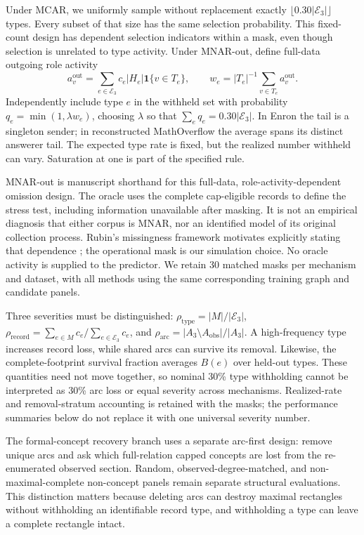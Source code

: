 \documentclass[10pt]{article}
\newcommand{\ind}{\mathbf{1}}
\begin{document}
Under MCAR, we uniformly sample without replacement exactly $\lfloor0.30|\mathcal E_3|\rfloor$ types. Every subset of that size has the same selection probability. This fixed-count design has dependent selection indicators within a mask, even though selection is unrelated to type activity. Under MNAR-out, define full-data outgoing role activity
\begin{equation}
a_v^{\mathrm{out}}=\sum_{e\in\mathcal E_3}c_e|H_e|\ind\{v\in T_e\},\qquad
w_e=|T_e|^{-1}\sum_{v\in T_e}a_v^{\mathrm{out}}.
\label{eq:activity}
\end{equation}
Independently include type $e$ in the withheld set with probability $q_e=\min(1,\lambda w_e)$, choosing $\lambda$ so that $\sum_e q_e=0.30|\mathcal E_3|$. In Enron the tail is a singleton sender; in reconstructed MathOverflow the average spans its distinct answerer tail. The expected type rate is fixed, but the realized number withheld can vary. Saturation at one is part of the specified rule.

MNAR-out is manuscript shorthand for this full-data, role-activity-dependent omission design. The oracle uses the complete cap-eligible records to define the stress test, including information unavailable after masking. It is not an empirical diagnosis that either corpus is MNAR, nor an identified model of its original collection process. Rubin's missingness framework motivates explicitly stating that dependence \citep{rubin1976}; the operational mask is our simulation choice. No oracle activity is supplied to the predictor. We retain 30 matched masks per mechanism and dataset, with all methods using the same corresponding training graph and candidate panels.

Three severities must be distinguished: $\rho_{\mathrm{type}}=|M|/|\mathcal E_3|$, $\rho_{\mathrm{record}}=\sum_{e\in M}c_e/\sum_{e\in\mathcal E_3}c_e$, and $\rho_{\mathrm{arc}}=|A_3\setminus A_{\mathrm{obs}}|/|A_3|$. A high-frequency type increases record loss, while shared arcs can survive its removal. Likewise, the complete-footprint survival fraction averages $B(e)$ over held-out types. These quantities need not move together, so nominal 30\% type withholding cannot be interpreted as 30\% arc loss or equal severity across mechanisms. Realized-rate and removal-stratum accounting is retained with the masks; the performance summaries below do not replace it with one universal severity number.

The formal-concept recovery branch uses a separate arc-first design: remove unique arcs and ask which full-relation capped concepts are lost from the re-enumerated observed section. Random, observed-degree-matched, and non-maximal-complete non-concept panels remain separate structural evaluations. This distinction matters because deleting arcs can destroy maximal rectangles without withholding an identifiable record type, and withholding a type can leave a complete rectangle intact.
\end{document}
